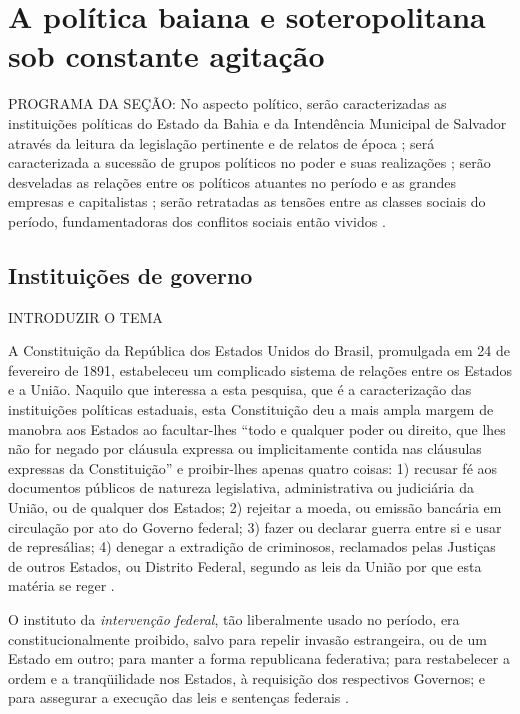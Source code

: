 \section{A política baiana e soteropolitana sob constante agitação}\label{sec:1.3}

PROGRAMA DA SEÇÃO: No aspecto político, serão caracterizadas as instituições políticas do Estado da Bahia e da Intendência Municipal de Salvador através da leitura da legislação pertinente e de relatos de época \cite{ruy_politica_1949, ruy_camara_1953}; será caracterizada a sucessão de grupos políticos no poder e suas realizações \cite{CUNHA2011, pang_coronelismo_1979, sampaio_partidos_1978, tavares_historia_2008}; serão desveladas as relações entre os políticos atuantes no período e as grandes empresas e capitalistas \cite{CUNHA2011}; serão retratadas as tensões entre as classes sociais do período, fundamentadoras dos conflitos sociais então vividos \cite{CUNHA2011, leite_bahiaciviliza_1996, santos_repovo_2001, souza_trabalholivre_2011}.

\subsection{Instituições de governo}

INTRODUZIR O TEMA

A Constituição da República dos Estados Unidos do Brasil, promulgada em 24 de fevereiro de 1891, estabeleceu um complicado sistema de relações entre os Estados e a União. Naquilo que interessa a esta pesquisa, que é a caracterização das instituições políticas estaduais, esta Constituição deu a mais ampla margem de manobra aos Estados ao facultar-lhes ``todo  e  qualquer  poder  ou  direito,  que  lhes  não  for  negado  por  cláusula  expressa  ou implicitamente contida nas cláusulas expressas da Constituição'' \cite[art.~65,~nº~2]{brasil_constituicao_1891} e proibir-lhes apenas quatro coisas: 1) recusar fé aos documentos públicos de natureza legislativa, administrativa ou judiciária da União, ou de qualquer dos Estados; 2) rejeitar a moeda, ou emissão bancária em circulação por ato do Governo federal; 3) fazer ou declarar guerra entre si e usar de represálias; 4) denegar a extradição de criminosos, reclamados pelas Justiças de outros Estados, ou Distrito Federal, segundo as leis da União por que esta matéria se reger \cite[art.~66,~nº~1~a~4]{brasil_constituicao_1891}.

O instituto da \textit{intervenção federal}, tão liberalmente usado no período, era constitucionalmente proibido, salvo para repelir invasão estrangeira, ou de um Estado em outro; para manter a forma republicana federativa; para restabelecer a ordem e a tranqüilidade nos Estados, à requisição dos respectivos Governos; e para assegurar a execução das leis e sentenças federais \cite[art.~6º,~nº~1~a~4]{brasil_constituicao_1891}.

